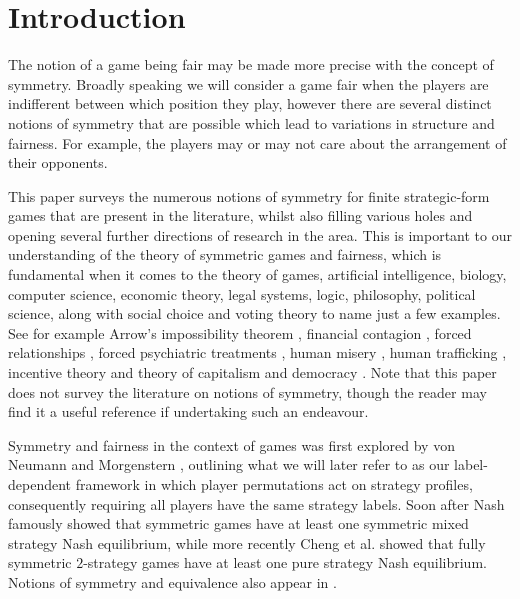 \section{Introduction} \label{sec:intro}
The notion of a game being fair may be made more precise with the concept of symmetry. Broadly speaking we will consider a game fair when the players are indifferent between which position they play, however there are several distinct notions of symmetry that are possible which lead to variations in structure and fairness. For example, the players may or may not care about the arrangement of their opponents. 

This paper surveys the numerous notions of symmetry for finite strategic-form games that are present in the literature, whilst also filling various holes and opening several further directions of research in the area. This is important to our understanding of the theory of symmetric games and fairness, which is fundamental when it comes to the theory of games, artificial intelligence, biology, computer science, economic theory, legal systems, logic, philosophy, political science, along with social choice and voting theory to name just a few examples. See for example Arrow's impossibility theorem \cite{arrow1950difficulty, arrow2012social}, financial contagion \cite{dungey2005contagion}, forced relationships \cite{chantler2009forced, ouattara1998forced}, forced psychiatric treatments \cite{minkowitz2006united}, human misery \cite{margolis2003misery, curato2019democracy}, human trafficking \cite{aronowitz2009human, shelley2010human, hesse2011young}, incentive theory \cite{laffont1993theory, laffont2009theory} and theory of capitalism \cite{harriss2006poverty} and democracy \cite{delli2002internet, walker1966critique}. Note that this paper does not survey the literature on notions of symmetry, though the reader may find it a useful reference if undertaking such an endeavour. 

Symmetry and fairness in the context of games was first explored by von Neumann and Morgenstern \cite{VNM}, outlining what we will later refer to as our label-dependent framework in which player permutations act on strategy profiles, consequently requiring all players have the same strategy labels. Soon after Nash \cite{NashNCG} famously showed that symmetric games have at least one symmetric mixed strategy Nash equilibrium, while more recently Cheng et al. \cite{CRVWSym} showed that fully symmetric $2$-strategy games have at least one pure strategy Nash equilibrium. Notions of symmetry and equivalence also appear in \cite{HarsanyiSelten}.

